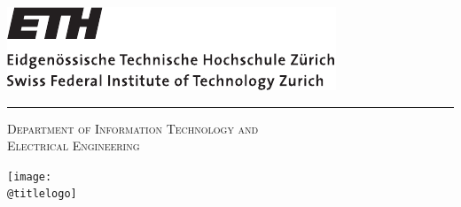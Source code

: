 \begin{titlepage}

 \thispagestyle{empty}

 \begin{center}
  \begin{minipage}[b]{0.45\linewidth}
   \vspace{0pt}
   \includegraphics[width=0.8\linewidth]{./figures/eth_logo}
  \end{minipage}\hfill
  \begin{minipage}{0.45\textwidth}
   \vspace{-0.55cm}
  \end{minipage}

  \vspace{0.1cm}

  \hspace*{0.15cm}\rule{0.985\textwidth}{0.4pt}

  \vspace{0.5cm}

  {\Large\textsc{Department of Information Technology and \\Electrical Engineering}}

  \vspace{0.2cm}

  \show@semester

  \vfill

  \begin{spacing}{2.0}
  {\Huge\textbf{\@title}}
  \end{spacing}

  \vspace{0.2cm}

  \show@reporttype

  \vfill

  \ifx\@titlelogo\@empty
   \relax
  \else
   \texttt{[image: \\@titlelogo]}
  \fi


\end{center}
\end{titlepage}
